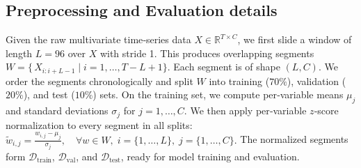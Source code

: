 \documentclass[sigconf,anonymous,review]{acmart}
\begin{document}
\begin{table}[h]
\centering
\caption{Overview of Datasets}
\label{tab:dataset_overview}
\end{table}





\subsection{Preprocessing and Evaluation details}
\label{appendix:preprocess_detailes}


Given the raw multivariate time‐series data $X\in\mathbb{R}^{T\times C}$, we first slide a window of length $L=96$ over $X$ with stride 1.  
This produces overlapping segments $W=\{\,X_{i:i+L-1}\mid i=1,\dots,T-L+1\}$.  
Each segment is of shape $(L,C)$.  
We order the segments chronologically and split $W$ into training ($70 \%$), validation ($20 \%$), and test ($10 \%$) sets.  
On the training set, we compute per‐variable means $\mu_j$ and standard deviations $\sigma_j$ for $j=1,\dots,C$.  
We then apply per‐variable $z$‐score normalization to every segment in all splits:  
$\tilde w_{i,j} = \frac{w_{i,j} - \mu_j}{\sigma_j},\quad
\forall w\in W,\;i=\{1,\dots,L\},\;j=\{1,\dots,C\}.$  
The normalized segments form $\mathcal{D}_{\mathrm{train}}$, $\mathcal{D}_{\mathrm{val}}$, and $\mathcal{D}_{\mathrm{test}}$, ready for model training and evaluation.
\end{document}
